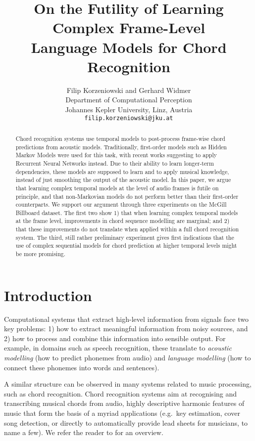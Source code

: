 \documentclass[twocolumn]{article}
\title{On the Futility of Learning Complex Frame-Level\\Language Models for Chord Recognition}
\author{Filip Korzeniowski and Gerhard Widmer\\
        {\small Department of Computational Perception}\\
        {\small Johannes Kepler University, Linz, Austria}\\
{\small \texttt{filip.korzeniowski@jku.at}}}
\date{}
\begin{document}
\maketitle %
\thispagestyle{fancy}

\begin{abstract}
Chord recognition systems use temporal models to post-process frame-wise chord
predictions from acoustic models. Traditionally, first-order models such as
Hidden Markov Models were used for this task, with recent works suggesting to
apply Recurrent Neural Networks instead. Due to their ability to learn
longer-term dependencies, these models are supposed to learn and to apply
musical knowledge, instead of just smoothing the output of the acoustic model.
In this paper, we argue that learning complex temporal models at the level of 
audio frames is futile on principle, and that non-Markovian models do not perform
better than their first-order counterparts. We support our argument 
through three experiments on the McGill Billboard dataset. The first
two show 1) that when learning complex temporal models at the frame level, 
improvements in chord sequence modelling are marginal; and 2) that these
improvements do not translate when applied within a full chord recognition
system. The third, still rather preliminary experiment gives first
indications that the use of complex sequential models for chord prediction at
higher temporal levels might be more promising.
\end{abstract}

\section{Introduction}

Computational systems that extract high-level information from signals face
two key problems: 1) how to extract meaningful information from noisy sources,
and 2) how to process and combine this information into sensible output.
For example, in domains such as speech recognition, these translate to
\emph{acoustic modelling} (how to predict phonemes from audio) 
and \emph{language modelling} (how to connect these phonemes into words and
sentences).

A similar structure can be observed in many systems related to music
processing, such as chord recognition. Chord recognition systems aim at
recognising and transcribing musical chords from audio, highly
descriptive harmonic features of music that form the basis of a myriad
applications (e.g.\ key estimation, cover song detection, or directly to
automatically provide lead sheets for musicians, to name a few). We refer
the reader to \cite{mcvicar_automatic_2014,cho_relative_2014} for an overview.
\end{document}
